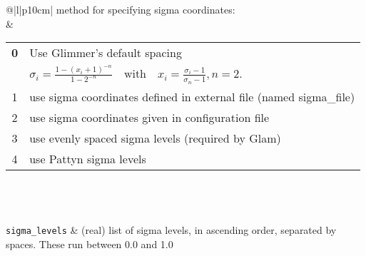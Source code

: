 \begin{center}
\begin{supertabular*}{\textwidth}{@{\extracolsep{\fill}}|l|p{10cm}|}
      method for specifying sigma coordinates:  \\ &
    \begin{tabular}[t]{cl}
      {\bf 0} & Use Glimmer's default spacing \\[0.05in] 
        & $\sigma_i=\frac{1-(x_i+1)^{-n}}{1-2^{-n}}\quad\mbox{with}\quad x_i=\frac{\sigma_i-1}{\sigma_n-1}, n=2.$ \\[0.05in]
      1 & use sigma coordinates defined in external file (named sigma\_file) \\
      2 & use sigma coordinates given in configuration file \\
      3 & use evenly spaced sigma levels (required by Glam) \\
      4 & use Pattyn sigma levels \\
    \end{tabular}\\



    \hline
    \hline
    \hline
    \\
    \hline
     \\
    \hline
    \texttt{sigma\_levels} & (real) list of sigma levels, in ascending order, separated by spaces. These run between 0.0 and 1.0 \\




\end{supertabular*}
\end{center}
